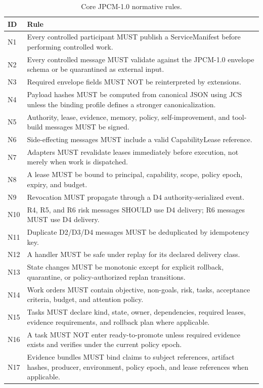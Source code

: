 \documentclass[journal,onecolumn]{IEEEtran}
\begin{document}
\begin{longtable}{p{}p{}}
\caption{Core JPCM-1.0 normative rules.}\\
\toprule
ID & Rule\\
\midrule
N1 & Every controlled participant MUST publish a ServiceManifest before performing controlled work.\\
N2 & Every controlled message MUST validate against the JPCM-1.0 envelope schema or be quarantined as external input.\\
N3 & Required envelope fields MUST NOT be reinterpreted by extensions.\\
N4 & Payload hashes MUST be computed from canonical JSON using JCS unless the binding profile defines a stronger canonicalization.\\
N5 & Authority, lease, evidence, memory, policy, self-improvement, and tool-build messages MUST be signed.\\
N6 & Side-effecting messages MUST include a valid CapabilityLease reference.\\
N7 & Adapters MUST revalidate leases immediately before execution, not merely when work is dispatched.\\
N8 & A lease MUST be bound to principal, capability, scope, policy epoch, expiry, and budget.\\
N9 & Revocation MUST propagate through a D4 authority-serialized event.\\
N10 & R4, R5, and R6 risk messages SHOULD use D4 delivery; R6 messages MUST use D4 delivery.\\
N11 & Duplicate D2/D3/D4 messages MUST be deduplicated by idempotency key.\\
N12 & A handler MUST be safe under replay for its declared delivery class.\\
N13 & State changes MUST be monotonic except for explicit rollback, quarantine, or policy-authorized replan transitions.\\
N14 & Work orders MUST contain objective, non-goals, risk, tasks, acceptance criteria, budget, and attention policy.\\
N15 & Tasks MUST declare kind, state, owner, dependencies, required leases, evidence requirements, and rollback plan where applicable.\\
N16 & A task MUST NOT enter ready-to-promote unless required evidence exists and verifies under the current policy epoch.\\
N17 & Evidence bundles MUST bind claims to subject references, artifact hashes, producer, environment, policy epoch, and lease references when applicable.\\

\end{longtable}
\end{document}
